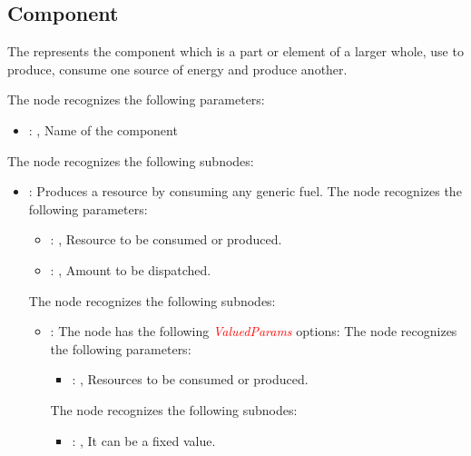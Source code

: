 

\subsection{Component}
  The  represents the component which is a part or element of a larger whole, use
  to produce, consume one source of energy and produce another.

  The  node recognizes the following parameters:
    \begin{itemize}
      \item {}: , 
        Name of the component
  \end{itemize}

  The  node recognizes the following subnodes:
  \begin{itemize}
    \item {}:
      Produces a resource by consuming any generic fuel.
      The  node recognizes the following parameters:
        \begin{itemize}
          \item {}: , 
            Resource to be consumed or produced.
          \item {}: , 
            Amount to be dispatched.
      \end{itemize}

      The  node recognizes the following subnodes:
      \begin{itemize}
        \item {}:
          The node  has the following \textcolor{red}{\textit{ValuedParams}}
          options:
          The  node recognizes the following parameters:
            \begin{itemize}
              \item {}: , 
                Resources to be consumed or produced.
          \end{itemize}

          The  node recognizes the following subnodes:
          \begin{itemize}
            \item {}: , 
              It can be a fixed value.


\end{itemize}
\end{itemize}
\end{itemize}
